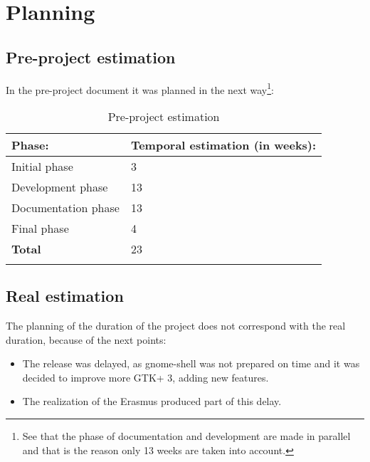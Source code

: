 
\chapter{Planning}

\section{Pre-project estimation}

In the pre-project document it was planned in the next way\footnote{See that the phase of documentation and development are made in parallel and that is the reason only 13 weeks are taken into account.}:

\begin{table}[H]
  \begin{center}
    \begin{tabularx}{0.60\textwidth}{|X|X|}
      \firsthline
      \textbf{Phase:} & \textbf{Temporal estimation (in weeks):} \\
      \hline
      Initial phase & 3 \\
      \hline
      Development phase & 13 \\
      \hline
      Documentation phase & 13 \\
      \hline
      Final phase & 4 \\
      \hline
      \textbf{Total} & 23 \\
      \lasthline
    \end{tabularx}
    \caption{Pre-project estimation}
  \end{center}
\end{table}

\newpage
{}

\newpage
{}

\newpage
\section{Real estimation}

The planning of the duration of the project does not correspond with the real duration, because of the next points:
\begin{itemize}
  \item The \GNOME release was delayed, as gnome-shell was not prepared on time and it was decided to improve more GTK+ 3, adding new features.
  \item The realization of the Erasmus produced part of this delay.
\end{itemize}

